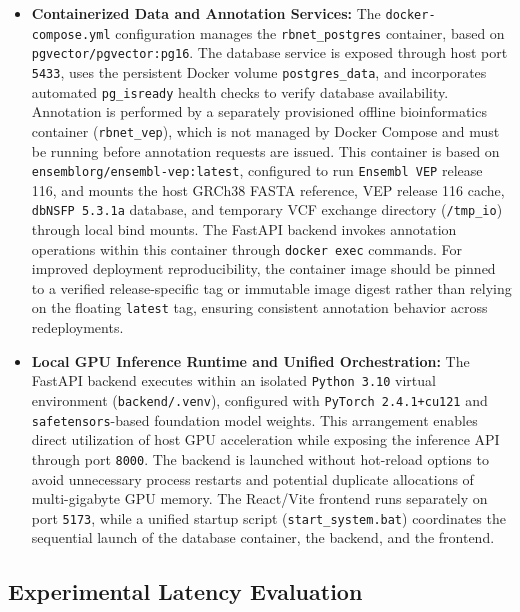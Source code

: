 \begin{itemize}
    \item \textbf{Containerized Data and Annotation Services:} The \texttt{docker-compose.yml} configuration manages the \texttt{rbnet\_postgres} container, based on \texttt{pgvector/pgvector:pg16}. The database service is exposed through host port \texttt{5433}, uses the persistent Docker volume \texttt{postgres\_data}, and incorporates automated \texttt{pg\_isready} health checks to verify database availability. Annotation is performed by a separately provisioned offline bioinformatics container (\texttt{rbnet\_vep}), which is not managed by Docker Compose and must be running before annotation requests are issued. This container is based on \texttt{ensemblorg/ensembl-vep:latest}, configured to run \texttt{Ensembl VEP} release 116, and mounts the host GRCh38 FASTA reference, VEP release 116 cache, \texttt{dbNSFP 5.3.1a} database, and temporary VCF exchange directory (\texttt{/tmp\_io}) through local bind mounts. The FastAPI backend invokes annotation operations within this container through \texttt{docker exec} commands. For improved deployment reproducibility, the container image should be pinned to a verified release-specific tag or immutable image digest rather than relying on the floating \texttt{latest} tag, ensuring consistent annotation behavior across redeployments.

    \item \textbf{Local GPU Inference Runtime and Unified Orchestration:} The FastAPI backend executes within an isolated \texttt{Python 3.10} virtual environment (\texttt{backend/.venv}), configured with \texttt{PyTorch 2.4.1+cu121} and \texttt{safetensors}-based foundation model weights. This arrangement enables direct utilization of host GPU acceleration while exposing the inference API through port \texttt{8000}. The backend is launched without hot-reload options to avoid unnecessary process restarts and potential duplicate allocations of multi-gigabyte GPU memory. The React/Vite frontend runs separately on port \texttt{5173}, while a unified startup script (\texttt{start\_system.bat}) coordinates the sequential launch of the database container, the backend, and the frontend.
\end{itemize}

\subsection{Experimental Latency Evaluation}

